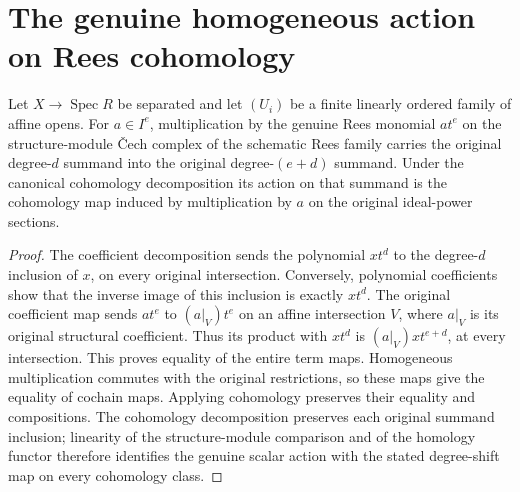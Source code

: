 \section{The genuine homogeneous action on Rees cohomology}

\begin{lemma}
\label{lem:fc-rees-cech-homogeneous-action}
\leanok
{}
Let $X\to\operatorname{Spec}R$ be separated and let $(U_i)$ be a finite
linearly ordered family of affine opens.  For $a\in I^e$, multiplication by
the genuine Rees monomial $at^e$ on the structure-module Čech complex of
the schematic Rees family carries the original degree-$d$ summand into
the original degree-$(e+d)$ summand.  Under the canonical cohomology
decomposition its action on that summand is the cohomology map induced
by multiplication by $a$ on the original ideal-power sections.
\end{lemma}
\begin{proof}
The coefficient decomposition sends the polynomial $xt^d$ to the
degree-$d$ inclusion of $x$, on every original intersection.  Conversely,
polynomial coefficients show that the inverse image of this inclusion
is exactly $xt^d$.  The original coefficient map sends $at^e$ to
$(a|_V)t^e$ on an affine intersection $V$, where $a|_V$ is its original
structural coefficient.  Thus its product with $xt^d$ is
$(a|_V)x t^{e+d}$, at every intersection.  This proves equality of the
entire term maps.  Homogeneous multiplication commutes with the
original restrictions, so these maps give the equality of cochain maps.
Applying cohomology preserves their equality and compositions.  The
cohomology decomposition preserves each original summand inclusion;
linearity of the structure-module comparison and of the homology
functor therefore identifies the genuine scalar action with the stated
degree-shift map on every cohomology class.
\end{proof}
